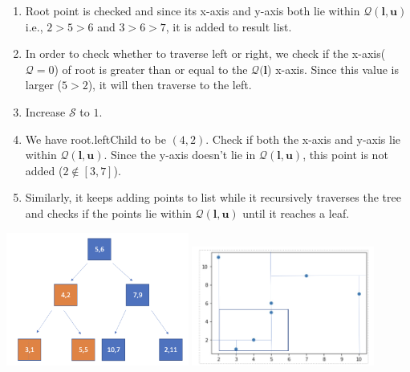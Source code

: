 \begin{mscexample}
\begin{enumerate}
\begin{enumerate}
        \item Root point is checked and since its x-axis and y-axis both lie within $\mathcal{Q}(\boldsymbol{l}, \boldsymbol{u})$ i.e., $2 > 5 > 6$ and $3 > 6 > 7$, it is added to result list.
        
         \item In order to check whether to traverse left or right, we check if the x-axis($\mathcal{Q} = 0$) of root is greater than or equal to the $\mathcal{Q}(\boldsymbol{l}$) x-axis. Since this value is larger ($5 > 2$), it will then traverse to the left. 
         
         \item Increase $\mathcal{S}$ to $1$.
         
         \item We have root.leftChild to be $(4,2)$. Check if both the x-axis and y-axis lie within  $\mathcal{Q}(\boldsymbol{l}, \boldsymbol{u})$. Since the y-axis doesn't lie in $\mathcal{Q}(\boldsymbol{l}, \boldsymbol{u})$, this point is not added ($2 \notin [3,7]$). 
         
         \item Similarly, it keeps adding points to list while it recursively traverses the tree and checks if the points lie within $\mathcal{Q}(\boldsymbol{l}, \boldsymbol{u})$ until it reaches a leaf.
         
	\end{enumerate}
	\begin{minipage}[t]{\linewidth}
        \centering
        \includegraphics[width=6cm]{graphs/Range_Query_Tree_02.png}
        \label{fig:KD-Tree_for_Range_Query_Case2}
        \hfill
        \includegraphics[width=6cm]{graphs/Range_Query_plot_02.png}
        \label{fig:KD_Tree_Range_Query_Plot_Case2}
        \end{minipage}
    

\end{enumerate}
\end{mscexample}
